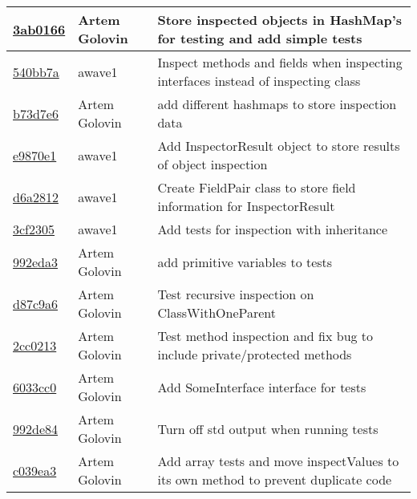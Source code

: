 \begin{tabularx}{\textwidth}{l l X}
\href{https://github.com/awave1/ObjectInspector/commit/3ab0166b0c6bcba1fb7351f428c1eb30311bf4bc}{3ab0166} & Artem Golovin & Store inspected objects in HashMap's for testing and add simple tests\\ \hline
\href{https://github.com/awave1/ObjectInspector/commit/540bb7a99b2b6281e3c70237ad770311a633bfb9}{540bb7a} & awave1 & Inspect methods and fields when inspecting interfaces instead of inspecting class\\ \hline
\href{https://github.com/awave1/ObjectInspector/commit/b73d7e66fd35fda567d401dfe5d5cb7afcc3a6e1}{b73d7e6} & Artem Golovin & add different hashmaps to store inspection data\\ \hline
\href{https://github.com/awave1/ObjectInspector/commit/e9870e193e943079829666047ab28577e3f36f5d}{e9870e1} & awave1 & Add InspectorResult object to store results of object inspection\\ \hline
\href{https://github.com/awave1/ObjectInspector/commit/d6a2812c427a7c4fe80afba2fa551b98b55d9d1c}{d6a2812} & awave1 & Create FieldPair class to store field information for InspectorResult\\ \hline
\href{https://github.com/awave1/ObjectInspector/commit/3cf2305bafbcd57ebdd8c5777dd9d438601f6f3f}{3cf2305} & awave1 & Add tests for inspection with inheritance\\ \hline
\href{https://github.com/awave1/ObjectInspector/commit/992eda3ee69738ed6c845e9ed27b29a375acab12}{992eda3} & Artem Golovin & add primitive variables to tests\\ \hline
\href{https://github.com/awave1/ObjectInspector/commit/d87c9a622b308a8f602daf11d50ef403aa514d6b}{d87c9a6} & Artem Golovin & Test recursive inspection on ClassWithOneParent\\ \hline
\href{https://github.com/awave1/ObjectInspector/commit/2cc02136ed850ffcae30fa4ee4a6ac93fd3fc298}{2cc0213} & Artem Golovin & Test method inspection and fix bug to include private/protected methods\\ \hline
\href{https://github.com/awave1/ObjectInspector/commit/6033cc05036e5672d4463d26b2c790fa28b9f3d1}{6033cc0} & Artem Golovin & Add SomeInterface interface for tests\\ \hline
\href{https://github.com/awave1/ObjectInspector/commit/992de84b26ebd8ff617c07ba1faa6c01e31d2418}{992de84} & Artem Golovin & Turn off std output when running tests\\ \hline
\href{https://github.com/awave1/ObjectInspector/commit/c039ea3e021ec865e6318bafcb992de302e1b03f}{c039ea3} & Artem Golovin & Add array tests and move inspectValues to its own method to prevent duplicate code\\ \hline

\end{tabularx}
